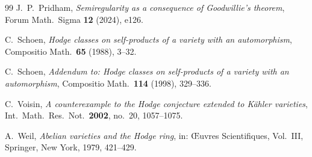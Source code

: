 \documentclass[11pt]{amsart}
\theoremstyle{definition}
\theoremstyle{remark}
\begin{document}
\begin{thebibliography}{99}
 J.~P.~Pridham, \emph{Semiregularity as a consequence of
Goodwillie's theorem}, Forum Math.\ Sigma \textbf{12} (2024), e126.

 C.~Schoen, \emph{Hodge classes on self-products of a variety
with an automorphism}, Compositio Math.\ \textbf{65} (1988), 3--32.

 C.~Schoen, \emph{Addendum to: Hodge classes on
self-products of a variety with an automorphism}, Compositio Math.\
\textbf{114} (1998), 329--336.

 C.~Voisin, \emph{A counterexample to the Hodge conjecture
extended to K\"ahler varieties}, Int.\ Math.\ Res.\ Not.\ \textbf{2002},
no.~20, 1057--1075.

 A.~Weil, \emph{Abelian varieties and the Hodge ring},
in: \OE uvres Scientifiques, Vol.~III, Springer, New York, 1979,
421--429.

\end{thebibliography}
\end{document}
